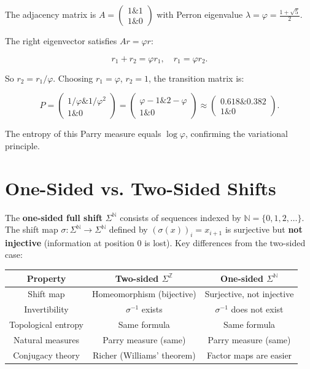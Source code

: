 \begin{example}
The adjacency matrix is $A = \begin{pmatrix} 1 \& 1 \\ 1 \& 0 \end{pmatrix}$ with Perron eigenvalue $\lambda = \varphi = \frac{1+\sqrt{5}}{2}$.

The right eigenvector satisfies $Ar = \varphi r$:

\[r_1 + r_2 = \varphi r_1, \quad r_1 = \varphi r_2.\]

So $r_2 = r_1 / \varphi$. Choosing $r_1 = \varphi$, $r_2 = 1$, the transition matrix is:

\[P = \begin{pmatrix} 1/\varphi \& 1/\varphi^2 \\ 1 \& 0 \end{pmatrix} = \begin{pmatrix} \varphi - 1 \& 2 - \varphi \\ 1 \& 0 \end{pmatrix} \approx \begin{pmatrix} 0.618 \& 0.382 \\ 1 \& 0 \end{pmatrix}.\]

The entropy of this Parry measure equals $\log \varphi$, confirming the variational principle.
\end{example}



\section{One-Sided vs. Two-Sided Shifts}

The \textbf{one-sided full shift} $\Sigma^{\mathbb{N}}$ consists of sequences indexed by $\mathbb{N} = \{ 0, 1, 2, \ldots\} $. The shift map $\sigma : \Sigma^{\mathbb{N}} \to \Sigma^{\mathbb{N}}$ defined by $(\sigma(x))_i = x_{i+1}$ is surjective but \textbf{not injective} (information at position 0 is lost). Key differences from the two-sided case:

\begin{center}
\begin{tabular}{ccc}
\toprule
Property & Two-sided $\Sigma^{\mathbb{Z}}$ & One-sided $\Sigma^{\mathbb{N}}$ \\
\midrule
Shift map & Homeomorphism (bijective) & Surjective, not injective \\
Invertibility & $\sigma^{-1}$ exists & $\sigma^{-1}$ does not exist \\
Topological entropy & Same formula & Same formula \\
Natural measures & Parry measure (same) & Parry measure (same) \\
Conjugacy theory & Richer (Williams' theorem) & Factor maps are easier \\
\bottomrule
\end{tabular}
\end{center}

